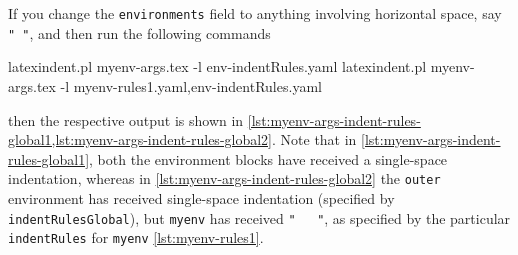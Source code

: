 \documentclass[10pt]{article}
\begin{document}
 \begin{example}
 If you change the \texttt{environments} field to anything involving horizontal space,
 say \lstinline!" "!, and then run the following commands 

 \begin{commandshell}
latexindent.pl myenv-args.tex -l env-indentRules.yaml
latexindent.pl myenv-args.tex -l myenv-rules1.yaml,env-indentRules.yaml
\end{commandshell}

 then the respective output is shown in
 \cref{lst:myenv-args-indent-rules-global1,lst:myenv-args-indent-rules-global2}. Note
 that in \cref{lst:myenv-args-indent-rules-global1}, both the environment blocks have
 received a single-space indentation, whereas in
 \cref{lst:myenv-args-indent-rules-global2} the \texttt{outer} environment has received
 single-space indentation (specified by \texttt{indentRulesGlobal}), but \texttt{myenv}
 has received \lstinline!"   "!, as specified by the particular \texttt{indentRules} for
 \texttt{myenv} \vref{lst:myenv-rules1}.

 \begin{cmhtcbraster}
 \end{cmhtcbraster}
 \end{example}
\end{document}
